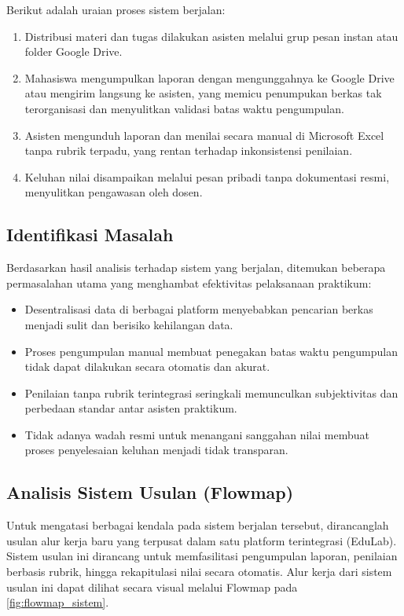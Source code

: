 \documentclass[12pt,a4paper,twoside]{report}
\begin{document}
Berikut adalah uraian proses sistem berjalan:
\begin{enumerate}
    \item Distribusi materi dan tugas dilakukan asisten melalui grup pesan instan atau folder Google Drive.
    \item Mahasiswa mengumpulkan laporan dengan mengunggahnya ke Google Drive atau mengirim langsung ke asisten, yang memicu penumpukan berkas tak terorganisasi dan menyulitkan validasi batas waktu pengumpulan.
    \item Asisten mengunduh laporan dan menilai secara manual di Microsoft Excel tanpa rubrik terpadu, yang rentan terhadap inkonsistensi penilaian.
    \item Keluhan nilai disampaikan melalui pesan pribadi tanpa dokumentasi resmi, menyulitkan pengawasan oleh dosen.
\end{enumerate}

\subsection{Identifikasi Masalah}

Berdasarkan hasil analisis terhadap sistem yang berjalan, ditemukan beberapa permasalahan utama yang menghambat efektivitas pelaksanaan praktikum:
\begin{itemize}
    \item Desentralisasi data di berbagai platform menyebabkan pencarian berkas menjadi sulit dan berisiko kehilangan data.
    \item Proses pengumpulan manual membuat penegakan batas waktu pengumpulan tidak dapat dilakukan secara otomatis dan akurat.
    \item Penilaian tanpa rubrik terintegrasi seringkali memunculkan subjektivitas dan perbedaan standar antar asisten praktikum.
    \item Tidak adanya wadah resmi untuk menangani sanggahan nilai membuat proses penyelesaian keluhan menjadi tidak transparan.
\end{itemize}

\subsection{Analisis Sistem Usulan (Flowmap)}

Untuk mengatasi berbagai kendala pada sistem berjalan tersebut, dirancanglah usulan alur kerja baru yang terpusat dalam satu platform terintegrasi (EduLab). Sistem usulan ini dirancang untuk memfasilitasi pengumpulan laporan, penilaian berbasis rubrik, hingga rekapitulasi nilai secara otomatis. Alur kerja dari sistem usulan ini dapat dilihat secara visual melalui Flowmap pada \autoref{fig:flowmap_sistem}.
\end{document}
